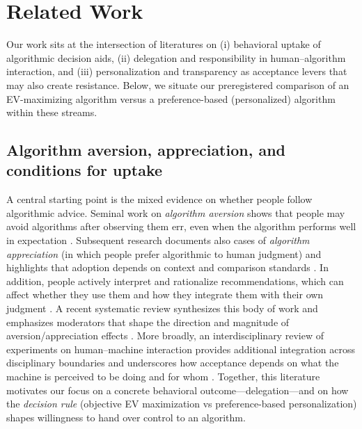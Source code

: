 \documentclass[a4paper, 12pt, fleqn]{article}
\theoremstyle{definition}
\begin{document}
\section{Related Work}
\label{sec:related}

Our work sits at the intersection of literatures on (i) behavioral uptake of algorithmic decision aids, (ii) delegation and responsibility in human--algorithm interaction, and (iii) personalization and transparency as acceptance levers that may also create resistance. Below, we situate our preregistered comparison of an EV-maximizing algorithm versus a preference-based (personalized) algorithm within these streams.

\subsection{Algorithm aversion, appreciation, and conditions for uptake}
A central starting point is the mixed evidence on whether people follow algorithmic advice. Seminal work on \emph{algorithm aversion} shows that people may avoid algorithms after observing them err, even when the algorithm performs well in expectation \citep{Dietvorst2018}. Subsequent research documents also cases of \emph{algorithm appreciation} (in which people prefer algorithmic to human judgment) and highlights that adoption depends on context and comparison standards \citep{Logg2019}. In addition, people actively interpret and rationalize recommendations, which can affect whether they use them and how they integrate them with their own judgment \citep{Yeomans2019}. A recent systematic review synthesizes this body of work and emphasizes moderators that shape the direction and magnitude of aversion/appreciation effects \citep{Mahmud2022}. More broadly, an interdisciplinary review of experiments on human--machine interaction provides additional integration across disciplinary boundaries and underscores how acceptance depends on what the machine is perceived to be doing and for whom \citep{Chugunova2022}. 
Together, this literature motivates our focus on a concrete behavioral outcome---delegation---and on how the \emph{decision rule} (objective EV maximization vs preference-based personalization) shapes willingness to hand over control to an algorithm.
\end{document}
